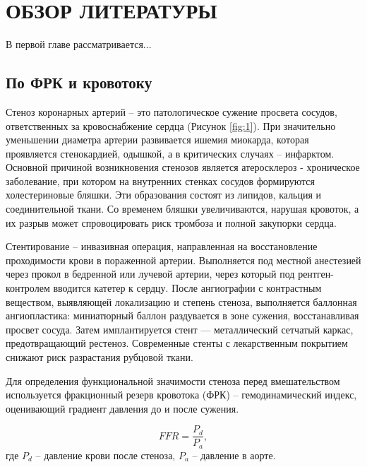 \chapter{\MakeUppercase{Обзор литературы}}
\label{ch:chap1}

В первой главе рассматривается...

\section{По ФРК и кровотоку}
Стеноз коронарных артерий -- это патологическое сужение просвета сосудов, ответственных за кровоснабжение сердца (Рисунок {\ref*{fig:1}}). При значительно уменьшении диаметра артерии развивается ишемия миокарда, которая проявляется стенокардией, одышкой, а в критических случаях -- инфарктом. Основной причиной возникновения стенозов является атеросклероз - хроническое заболевание, при котором на внутренних стенках сосудов формируются холестериновые бляшки. Эти образования состоят из липидов, кальция и соединительной ткани. Со временем бляшки увеличиваются, нарушая кровоток, а их разрыв может спровоцировать риск тромбоза и полной закупорки сердца.

  
Стентирование -- инвазивная операция, направленная на восстановление проходимости крови в пораженной артерии. Выполняется под местной анестезией через прокол в бедренной или лучевой артерии, через который под рентген-контролем вводится катетер к сердцу. После ангиографии с контрастным веществом, выявляющей локализацию и степень стеноза, выполняется баллонная ангиопластика: миниатюрный баллон раздувается в зоне сужения, восстанавливая просвет сосуда. Затем имплантируется стент — металлический сетчатый каркас, предотвращающий рестеноз. Современные стенты с лекарственным покрытием снижают риск разрастания рубцовой ткани.


Для определения функциональной значимости стеноза перед вмешательством используется фракционный резерв кровотока (ФРК) -- гемодинамический индекс, оценивающий градиент давления до и после сужения. 

\begin{equation}\label{eq:e1}
	FFR = \frac{P_d}{P_a},
\end{equation}
где $P_d$ -- давление крови после стеноза, $P_a$ -- давление в аорте.

